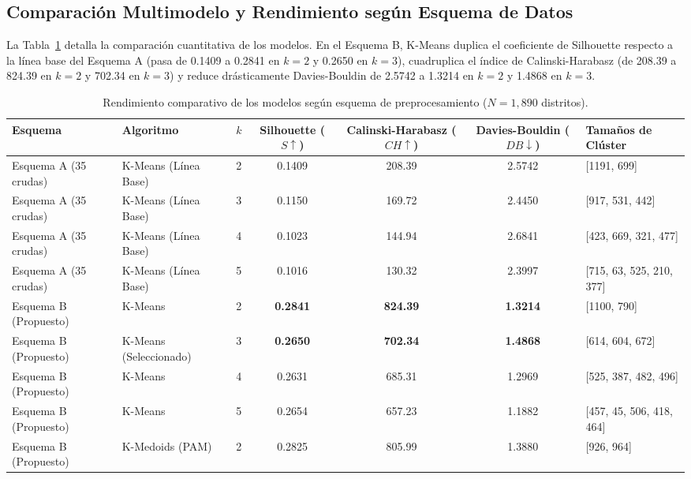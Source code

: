 \documentclass[conference,10pt,letterpaper]{IEEEtran}
\begin{document}
\subsection{Comparación Multimodelo y Rendimiento según Esquema de Datos}

La Tabla~\ref{tab:modelos} detalla la comparación cuantitativa de los modelos. En el Esquema B, K-Means duplica el coeficiente de Silhouette respecto a la línea base del Esquema A (pasa de 0.1409 a 0.2841 en $k = 2$ y 0.2650 en $k = 3$), cuadruplica el índice de Calinski-Harabasz (de 208.39 a 824.39 en $k = 2$ y 702.34 en $k = 3$) y reduce drásticamente Davies-Bouldin de 2.5742 a 1.3214 en $k = 2$ y 1.4868 en $k = 3$.

\begin{table}[t]
\centering
\caption{Rendimiento comparativo de los modelos según esquema de preprocesamiento ($N = 1,890$ distritos).}
\label{tab:modelos}
\scriptsize
\setlength{\tabcolsep}{3.2pt}
\begin{tabular*}{\textwidth}{@{\extracolsep{\fill}} l l c c c c l @{}}
\toprule
\textbf{Esquema} & \textbf{Algoritmo} & \textbf{$k$} & \textbf{Silhouette ($S \uparrow$)} & \textbf{Calinski-Harabasz ($CH \uparrow$)} & \textbf{Davies-Bouldin ($DB \downarrow$)} & \textbf{Tamaños de Clúster} \\
\midrule
Esquema A (35 crudas) & K-Means (Línea Base) & 2 & 0.1409 & 208.39 & 2.5742 & [1191, 699] \\
Esquema A (35 crudas) & K-Means (Línea Base) & 3 & 0.1150 & 169.72 & 2.4450 & [917, 531, 442] \\
Esquema A (35 crudas) & K-Means (Línea Base) & 4 & 0.1023 & 144.94 & 2.6841 & [423, 669, 321, 477] \\
Esquema A (35 crudas) & K-Means (Línea Base) & 5 & 0.1016 & 130.32 & 2.3997 & [715, 63, 525, 210, 377] \\
\midrule
Esquema B (Propuesto) & K-Means & 2 & \textbf{0.2841} & \textbf{824.39} & \textbf{1.3214} & [1100, 790] \\
Esquema B (Propuesto) & K-Means (Seleccionado) & 3 & \textbf{0.2650} & \textbf{702.34} & \textbf{1.4868} & [614, 604, 672] \\
Esquema B (Propuesto) & K-Means & 4 & 0.2631 & 685.31 & 1.2969 & [525, 387, 482, 496] \\
Esquema B (Propuesto) & K-Means & 5 & 0.2654 & 657.23 & 1.1882 & [457, 45, 506, 418, 464] \\
Esquema B (Propuesto) & K-Medoids (PAM) & 2 & 0.2825 & 805.99 & 1.3880 & [926, 964] \\

\end{tabular*}
\end{table}
\end{document}
